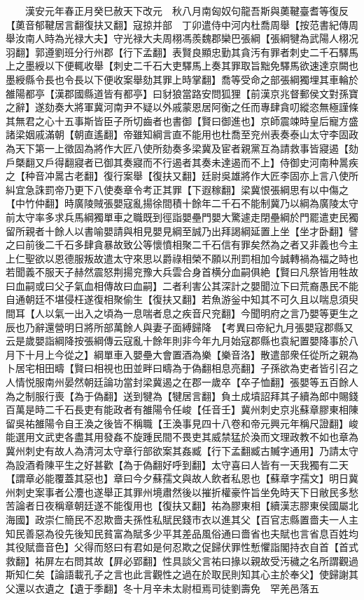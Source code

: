 　　漢安元年春正月癸巳赦天下改元　秋八月南匈奴句龍吾斯與薁鞬臺耆等復反【薁音郁鞬居言翻復扶又翻】寇掠并部　丁卯遣侍中河内杜喬周舉【按范書紀傳周舉汝南人時為光禄大夫】守光禄大夫周栩馮羨魏郡欒巴張綱【張綱犍為武陽人栩况羽翻】郭遵劉班分行州郡【行下孟翻】表賢良顯忠勤其貪汚有罪者刺史二千石驛馬上之墨綬以下便輒收舉【刺史二千石大吏驛馬上奏其罪取旨黜免驛馬欲速達京闕也墨綬縣令長也令長以下便收案舉劾其罪上時掌翻】喬等受命之部張綱獨埋其車輪於雒陽都亭【漢郡國縣道皆有都亭】曰豺狼當路安問狐狸【前漢京兆督郵侯文對孫寶之辭】遂劾奏大將軍冀河南尹不疑以外戚蒙恩居阿衡之任而專肆貪叨縱恣無極謹條其無君之心十五事斯皆臣子所切齒者也書御【賢曰御進也】京師震竦時皇后寵方盛諸梁姻戚滿朝【朝直遙翻】帝雖知綱言直不能用也杜喬至兖州表奏泰山太守李固政為天下第一上徵固為將作大匠八使所劾奏多梁冀及宦者親黨互為請救事皆寢遏【劾戶槩翻又戶得翻寢者已御其奏寢而不行遏者其奏未達遏而不上】侍御史河南种暠疾之【种音冲暠古老翻】復行案舉【復扶又翻】廷尉吳雄將作大匠李固亦上言八使所糾宜急誅罰帝乃更下八使奏章令考正其罪【下遐稼翻】梁冀恨張綱思有以中傷之【中竹仲翻】時廣陵賊張嬰寇亂揚徐間積十餘年二千石不能制冀乃以綱為廣陵太守前太守率多求兵馬綱獨單車之職既到徑詣嬰壘門嬰大驚遽走閉壘綱於門罷遣吏民獨留所親者十餘人以書喻嬰請與相見嬰見綱至誠乃出拜謁綱延置上坐【坐才卧翻】譬之曰前後二千石多肆貪暴故致公等懷憤相聚二千石信有罪矣然為之者又非義也今主上仁聖欲以恩德服叛故遣太守來思以爵祿相榮不願以刑罰相加今誠轉禍為福之時也若聞義不服天子赫然震怒荆揚兖豫大兵雲合身首横分血嗣俱絶【賢曰凡祭皆用牲故曰血嗣或曰父子氣血相傳故曰血嗣】二者利害公其深計之嬰聞泣下曰荒裔愚民不能自通朝廷不堪侵枉遂復相聚偷生【復扶又翻】若魚游釡中知其不可久且以喘息須臾間耳【人以氣一出入之頃為一息喘者息之疾音尺兖翻】今聞明府之言乃嬰等更生之辰也乃辭還營明日將所部萬餘人與妻子面縛歸降　【考異曰帝紀九月張嬰寇郡縣又云是歲嬰詣綱降按張綱傳云寇亂十餘年則非今年九月始寇郡縣也袁紀置嬰降事於八月下十月上今從之】綱單車入嬰壘大會置酒為樂【樂音洛】散遣部衆任從所之親為卜居宅相田疇【賢曰相視也田並畔曰疇為于偽翻相息亮翻】子孫欲為吏者皆引召之人情悦服南州晏然朝廷論功當封梁冀遏之在郡一歲卒【卒子恤翻】張嬰等五百餘人為之制服行喪【為于偽翻】送到犍為【犍居言翻】負土成墳詔拜其子續為郎中賜錢百萬是時二千石長吏有能政者有雒陽令任峻【任音壬】冀州刺史京兆蘇章膠東相陳留吳祐雒陽令自王渙之後皆不稱職【王渙事見四十八卷和帝元興元年稱尺證翻】峻能選用文武吏各盡其用發姦不旋踵民間不畏吏其威禁猛於渙而文理政教不如也章為冀州刺史有故人為清河太守章行部欲案其姦臧【行下孟翻臧古贓字通用】乃請太守為設酒肴陳平生之好甚歡【為于偽翻好呼到翻】太守喜曰人皆有一天我獨有二天【謂章必能覆蓋其惡也】章曰今夕蘇孺文與故人飲者私恩也【蘇章字孺文】明日冀州刺史案事者公灋也遂舉正其罪州境肅然後以摧折權豪忤旨坐免時天下日敝民多愁苦論者日夜稱章朝廷遂不能復用也【復扶又翻】祐為膠東相【續漢志膠東侯國屬北海國】政崇仁簡民不忍欺嗇夫孫性私賦民錢市衣以進其父【百官志縣置嗇夫一人主知民善惡為役先後知民貧富為賦多少平其差品風俗通曰嗇省也夫賦也言省息百姓均其役賦嗇音色】父得而怒曰有君如是何忍欺之促歸伏罪性慙懼詣閣持衣自首【首式救翻】祐屏左右問其故【屛必郢翻】性具談父言祐曰掾以親故受汚穢之名所謂觀過斯知仁矣【論語載孔子之言也此言觀性之過在於取民則知其心主於奉父】使歸謝其父還以衣遺之【遺于季翻】冬十月辛未太尉桓焉司徒劉壽免　罕羌邑落五

